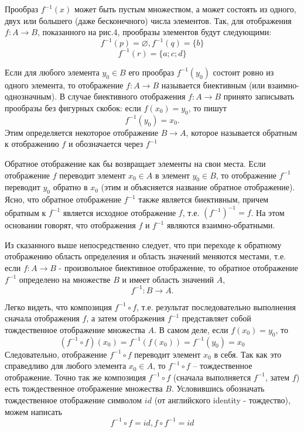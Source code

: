 \documentclass{article}
\begin{document}
%
%
%
%
%
\par Прообраз $f^{-1}(x)$ может быть пустым множеством, а может состоять из одного, двух или большего (даже бесконечного) числа элементов. Так, для отображения $f\colon A\to B$, показанного на рис.4, прообразы элементов будут следующими:
$$f^{-1}(p)=\varnothing, f^{-1}(q)=\{b\}$$
$$f^{-1}(r)=\{a; c; d\}$$
\par Если для любого элемента $y_0\in B$ его прообраз $f^{-1}(y_0)$ состоит ровно из одного элемента, то отображение $f\colon A\to B$ называется биективным (или взаимно-однозначным). В случае биективного отображения $f\colon A\to B$ принято записывать прообразы без фигурных скобок: если $f(x_0)=y_0$, то пишут
$$f^{-1}(y_0)=x_0.$$
Этим определяется некоторое отображение $B\to A$, которое называется обратным к отображению $f$ и обозначается через $f^{-1}$
\par Обратное отображение как бы возвращает элементы на свои места. Если отображение $f$ переводит элемент $x_0 \in A$ в элемент $y_0\in B$, то отображение $f^{-1}$ переводит $y_0$ обратно в $x_0$ (этим и объясняется название обратное отображение). Ясно, что обратное отображение $f^{-1}$ также является биективным, причем обратным к $f^{-1}$ является исходное отображение $f$, т.е. $(f^{-1})^{-1}=f$. На этом основании говорят, что отображения $f$ и $f^{-1}$ являются взаимно-обратными.
\par Из сказанного выше непосредственно следует, что при переходе к обратному отображению область определения и область значений меняются местами, т.е. если $f\colon A\to B$ - произвольное биективное отображение, то обратное отображение $f^{-1}$ определено на множестве $B$ и имеет область значений $A$,
$$f^{-1}:B\to A.$$
\par Легко видеть, что композиция $f^{-1}\circ f$, т.е. результат последовательно выполнения сначала отображения $f$, а затем отображения $f^{-1}$ представляет собой тождественное отображение множества $A$. В самом деле, если $f(x_0)=y_0$, то
$$(f^{-1}\circ f)(x_0)=f^{-1}(f(x_0))=f^{-1}(y_0)=x_0$$
Следовательно, отображение $f^{-1}\circ f$ переводит элемент $x_0$ в себя. Так как это справедливо для любого элемента $x_0 \in A$, то $f^{-1}\circ f$ -- тождественное отображение. Точно так же композиция $f^{-1}\circ f$ (сначала выполняется $f^{-1}$, затем $f$) есть тождественное отображение множества $B$. Условившись обозначать тождественное отображение символом $id$ (от английского identity - тождество), можем написать
\begin{equation}\label{E1}
f^{-1}\circ f=id,f\circ f^{-1}=id
\end{equation}
\end{document}
